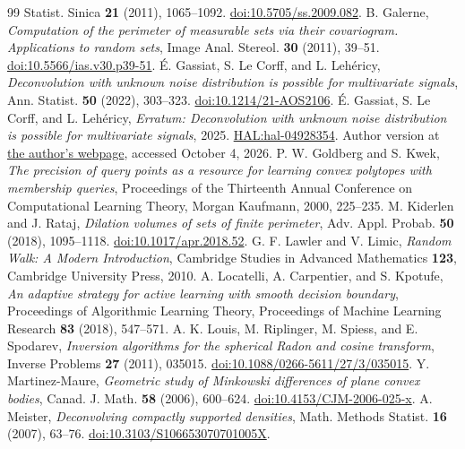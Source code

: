 \begin{thebibliography}{99}
Statist. Sinica \textbf{21} (2011), 1065--1092.
\href{https://doi.org/10.5705/ss.2009.082}{doi:10.5705/ss.2009.082}.
B. Galerne, \emph{Computation of the perimeter of measurable sets via
their covariogram. Applications to random sets},
Image Anal. Stereol. \textbf{30} (2011), 39--51.
\href{https://doi.org/10.5566/ias.v30.p39-51}
{doi:10.5566/ias.v30.p39-51}.
\'E. Gassiat, S. Le Corff, and L. Leh\'ericy,
\emph{Deconvolution with unknown noise distribution is possible for multivariate
signals}, Ann. Statist. \textbf{50} (2022), 303--323.
\href{https://doi.org/10.1214/21-AOS2106}{doi:10.1214/21-AOS2106}.
\'E. Gassiat, S. Le Corff, and L. Leh\'ericy,
\emph{Erratum: Deconvolution with unknown noise distribution is possible
for multivariate signals}, 2025.
\href{https://hal.science/hal-04928354}{HAL:hal-04928354}.
Author version at
\href{https://www.imo.universite-paris-saclay.fr/~elisabeth.gassiat/erratum.pdf}
{the author's webpage}, accessed October 4, 2026.
P. W. Goldberg and S. Kwek,
\emph{The precision of query points as a resource for learning convex
polytopes with membership queries},
Proceedings of the Thirteenth Annual Conference on Computational
Learning Theory, Morgan Kaufmann, 2000, 225--235.
M. Kiderlen and J. Rataj, \emph{Dilation volumes of sets of finite perimeter},
Adv. Appl. Probab. \textbf{50} (2018), 1095--1118.
\href{https://doi.org/10.1017/apr.2018.52}{doi:10.1017/apr.2018.52}.
G. F. Lawler and V. Limic, \emph{Random Walk: A Modern Introduction},
Cambridge Studies in Advanced Mathematics \textbf{123}, Cambridge
University Press, 2010.
A. Locatelli, A. Carpentier, and S. Kpotufe,
\emph{An adaptive strategy for active learning with smooth decision boundary},
Proceedings of Algorithmic Learning Theory, Proceedings of Machine
Learning Research \textbf{83} (2018), 547--571.
A. K. Louis, M. Riplinger, M. Spiess, and E. Spodarev,
\emph{Inversion algorithms for the spherical Radon and cosine transform},
Inverse Problems \textbf{27} (2011), 035015.
\href{https://doi.org/10.1088/0266-5611/27/3/035015}
{doi:10.1088/0266-5611/27/3/035015}.
Y. Martinez-Maure, \emph{Geometric study of Minkowski differences of
plane convex bodies}, Canad. J. Math. \textbf{58} (2006), 600--624.
\href{https://doi.org/10.4153/CJM-2006-025-x}{doi:10.4153/CJM-2006-025-x}.
A. Meister, \emph{Deconvolving compactly supported densities},
Math. Methods Statist. \textbf{16} (2007), 63--76.
\href{https://doi.org/10.3103/S106653070701005X}{doi:10.3103/S106653070701005X}.

\end{thebibliography}
